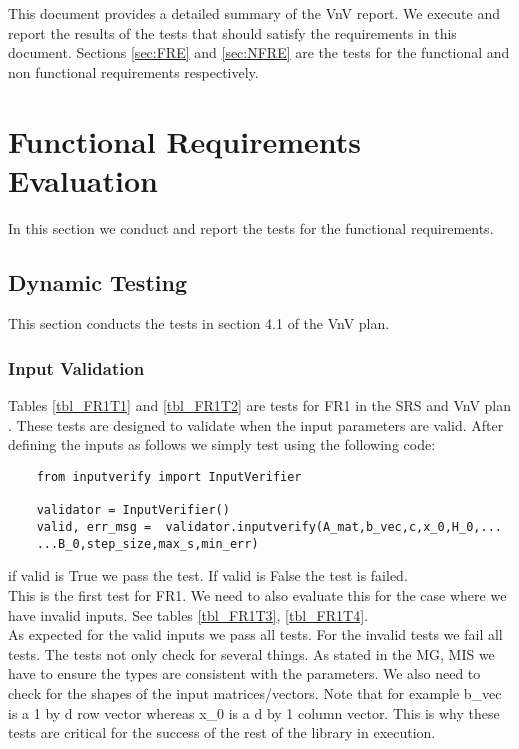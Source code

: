 \documentclass[12pt, titlepage]{article}
\begin{document}
\newpage


This document provides a detailed summary of the VnV report. We execute and report the results of the tests that should satisfy the requirements in this document. Sections \ref{sec:FRE} and \ref{sec:NFRE} are the tests for the functional and non functional requirements respectively.

\section{Functional Requirements Evaluation}
In this section we conduct and report the tests for the functional requirements.
\label{sec:FRE}
\subsection{Dynamic Testing}
This section conducts the tests in section 4.1 of the VnV plan.
\subsubsection{Input Validation}
Tables \ref{tbl_FR1T1} and \ref{tbl_FR1T2} are tests for FR1 in the SRS and VnV plan \citep{SRS}. These tests are designed to validate when the input parameters are valid. After defining the inputs as follows we simply test using the following code: 
\begin{lstlisting}
    from inputverify import InputVerifier
    
    validator = InputVerifier()
    valid, err_msg =  validator.inputverify(A_mat,b_vec,c,x_0,H_0,...
    ...B_0,step_size,max_s,min_err)
\end{lstlisting}
if valid is True we pass the test. If valid is False the test is failed.
\\

This is the first test for FR1. We need to also evaluate this for the case where we have invalid inputs. See tables \ref{tbl_FR1T3}, \ref{tbl_FR1T4}.
\\

As expected for the valid inputs we pass all tests. For the invalid tests we fail all tests. The tests not only check for several things. As stated in the MG, MIS \citep{SRS} we have to ensure the types are consistent with the parameters. We also need to check for the shapes of the input matrices/vectors. Note that for example b\_vec is a 1 by d row vector whereas x\_0 is a d by 1 column vector. This is why these tests are critical for the success of the rest of the library in execution.
\end{document}
